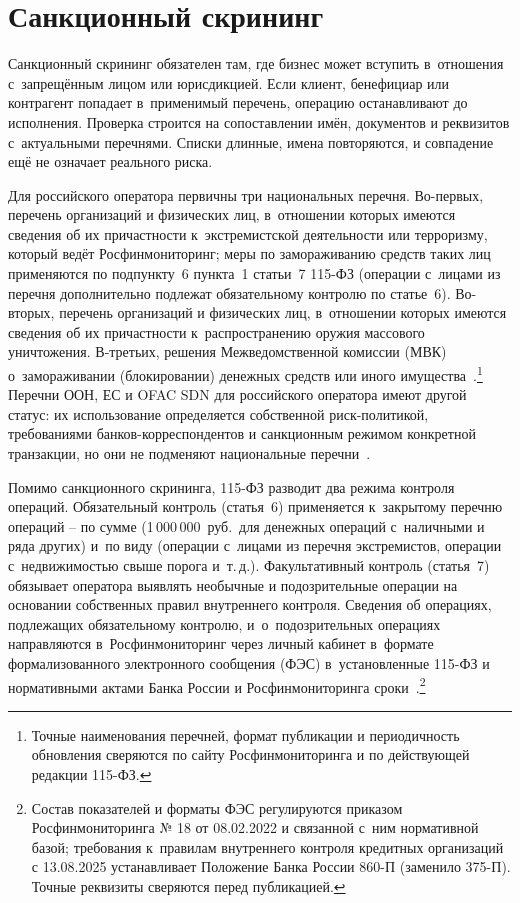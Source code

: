 \section{Санкционный скрининг}\label{sec:compliance-sanctions}

Санкционный скрининг обязателен там, где бизнес может вступить
в~отношения с~запрещённым лицом или юрисдикцией. Если клиент,
бенефициар или контрагент попадает в~применимый перечень, операцию
останавливают до исполнения. Проверка строится на сопоставлении
имён, документов и реквизитов с~актуальными перечнями. Списки
длинные, имена повторяются, и совпадение ещё не означает реального
риска.

Для российского оператора первичны три национальных
перечня. Во-первых, перечень организаций и физических лиц,
в~отношении которых имеются сведения об их причастности
к~экстремистской деятельности или терроризму, который ведёт
Росфинмониторинг; меры по замораживанию средств таких лиц
применяются по подпункту~6 пункта~1 статьи~7 115-ФЗ
(операции с~лицами из перечня дополнительно подлежат
обязательному контролю по статье~6). Во-вторых, перечень
организаций и физических лиц, в~отношении которых имеются
сведения об их причастности к~распространению оружия
массового уничтожения. В-третьих, решения Межведомственной
комиссии (МВК) о~замораживании (блокировании) денежных
средств или иного имущества~\cite{rosfinmonitoring-lists,fz-115,cbr-mvk}.\footnote{Точные
наименования перечней, формат публикации и периодичность
обновления сверяются по сайту Росфинмониторинга и по
действующей редакции 115-ФЗ.} Перечни ООН, ЕС и OFAC SDN
для российского оператора имеют другой статус: их использование
определяется собственной риск-политикой, требованиями
банков-корреспондентов и санкционным режимом конкретной
транзакции, но они не подменяют национальные
перечни~\cite{ofac-sanctions-list-service,eu-sanctions-info,unsc-consolidated-list}.

Помимо санкционного скрининга, 115-ФЗ разводит два режима
контроля операций. Обязательный контроль (статья~6) применяется
к~закрытому перечню операций -- по сумме (1\,000\,000~руб.\
для денежных операций с~наличными и ряда других) и~по виду
(операции с~лицами из перечня экстремистов, операции
с~недвижимостью свыше порога и~т.\,д.). Факультативный контроль
(статья~7) обязывает оператора выявлять необычные
и подозрительные операции на основании собственных правил
внутреннего контроля. Сведения об операциях, подлежащих
обязательному контролю, и~о~подозрительных операциях
направляются в~Росфинмониторинг через личный кабинет в~формате
формализованного электронного сообщения (ФЭС) в~установленные
115-ФЗ и нормативными актами Банка России и
Росфинмониторинга сроки~\cite{fz-115,cbr-860p,rosfinmonitoring-oes}.\footnote{Состав
показателей и форматы ФЭС регулируются приказом Росфинмониторинга
№ 18 от 08.02.2022 и связанной с~ним нормативной базой;
требования к~правилам внутреннего контроля кредитных организаций
с 13.08.2025 устанавливает Положение Банка России 860-П
(заменило 375-П). Точные реквизиты сверяются перед публикацией.}

